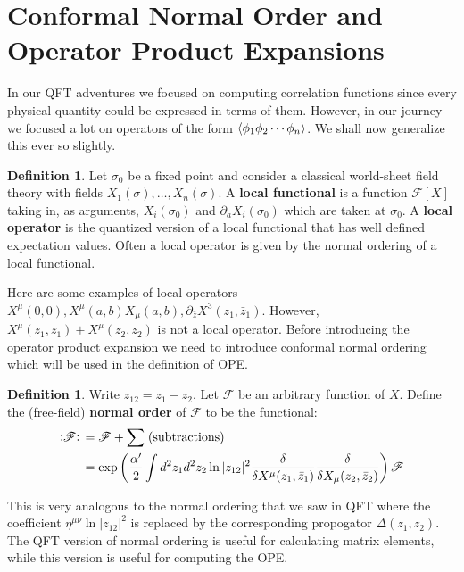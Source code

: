 \documentclass{report}
\theoremstyle{plain}
\theoremstyle{definition}
\newtheorem{definition}[theorem]{Definition}
\theoremstyle{remark}
\newcommand{\FR}[2]{\frac{#1}{#2}}
\newcommand{\ms}{\mathscr}
\newcommand{\sg}{\sigma}
\newcommand{\di}{\partial}
\newcommand{\NO}[1]{\vcentcolon\mathrel{#1}\vcentcolon\,}
\begin{document}
\section{Conformal Normal Order and Operator Product Expansions}

In our QFT adventures we focused on computing correlation functions since
every physical quantity could be expressed in terms of them. However, in
our journey we focused a lot on operators of the form
$\braket{\phi_1\phi_2\cdots\phi_n}$. We shall now generalize this ever so
slightly.

\begin{definition} Let $\sg_0$ be a fixed point and consider a classical
world-sheet field theory with fields $X_1(\sg),\ldots,X_n(\sg)$. A
\textbf{local functional} is a function
$\ms F[X]$ taking in, as arguments, $X_i(\sg_0)$ and $\di_a
X_i(\sg_0)$ which are taken at $\sg_0$. A \textbf{local operator} is the
quantized version of a local functional that has well defined expectation
values. Often a local operator is given by the normal ordering of a local
functional.
\end{definition}
Here are some examples of local operators $X^\mu(0,0),
X^\mu(a,b)X_\mu(a,b), \di_{\bar z}X^3(z_1,\bar z_1)$. However,
$X^\mu(z_1,\bar z_1)+X^\mu(z_2,\bar z_2)$ is not a local operator.  Before
introducing the operator product expansion we need to introduce conformal
normal ordering which will be used in the definition of OPE.

\begin{definition}
  Write $z_{12} = z_1 - z_2$. Let $\ms F$ be an arbitrary function of
  $X$. Define the (free-field) {\bf normal order} of $\ms F$ to be the
  functional:
  \begin{align}
  \label{normalorderdefinition}
  \NO{\ms F} &= \ms F + \sum \;(\text{subtractions})\\
  &= \exp \left( \FR{\alpha'}{2}\int d^2z_1d^2z_2 \ln|z_{12}|^2
  \FR{\delta}{\delta X^\mu(z_1,\bar z_1)}
  \FR{\delta}{\delta X_\mu(z_2,\bar z_2)} \right) \ms F
  \end{align}
\end{definition}
This is very analogous to the normal ordering that we saw in QFT where the
coefficient $\eta^{\mu\nu}\ln|z_{12}|^2$ is replaced by the corresponding
propogator $\Delta(z_1,z_2)$. The QFT version of normal ordering is useful
for calculating matrix elements, while this version is useful for computing
the OPE.
\end{document}
